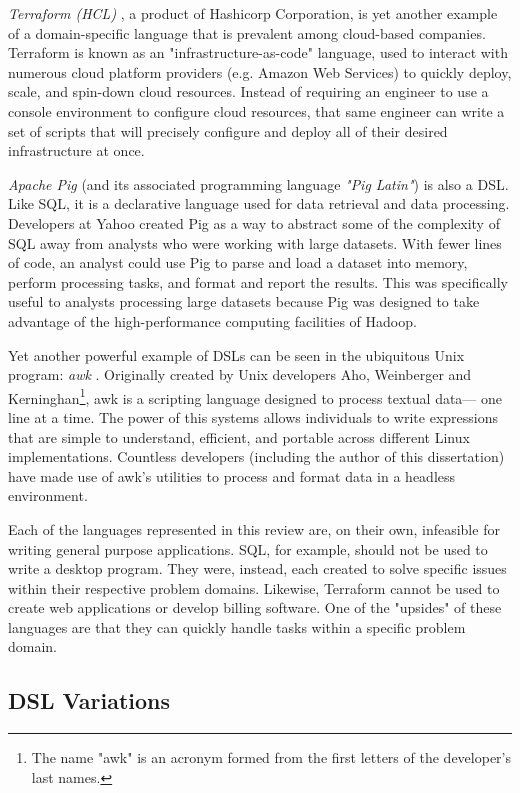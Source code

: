 \textit{Terraform (HCL)} \cite{dsl-terraform}, a product of Hashicorp Corporation, is yet another example of a domain-specific language that is prevalent among cloud-based companies. Terraform is known as an "infrastructure-as-code" language, used to interact with numerous cloud platform providers (e.g. Amazon Web Services) to quickly deploy, scale, and spin-down cloud resources. Instead of requiring an engineer to use a console environment to configure cloud resources, that same engineer can write a set of scripts that will precisely configure and deploy all of their desired infrastructure at once.

\textit{Apache Pig} \cite{dsl-pig-latin} (and its associated programming language \textit{"Pig Latin"}) is also a DSL. Like SQL, it is a declarative language used for data retrieval and data processing. Developers at Yahoo created Pig as a way to abstract some of the complexity of SQL away from analysts who were working with large datasets. With fewer lines of code, an analyst could use Pig to parse and load a dataset into memory, perform processing tasks, and format and report the results. This was specifically useful to analysts processing large datasets because Pig was designed to take advantage of the high-performance computing facilities of Hadoop.

Yet another powerful example of DSLs can be seen in the ubiquitous Unix program: \textit{awk} \cite{dsl-awk}. Originally created by Unix developers Aho, Weinberger and Kerninghan\footnote{The name "awk" is an acronym formed from the first letters of the developer's last names.}, awk is a scripting language designed to process textual data--- one line at a time. The power of this systems allows individuals to write expressions that are simple to understand, efficient, and portable across different Linux implementations. Countless developers (including the author of this dissertation) have made use of awk's utilities to process and format data in a headless environment.

Each of the languages represented in this review are, on their own, infeasible for writing general purpose applications. SQL, for example, should not be used to write a desktop program. They were, instead, each created to solve specific issues within their respective problem domains. Likewise, Terraform cannot be used to create web applications or develop billing software. One of the "upsides" of these languages are that they can quickly handle tasks within a specific problem domain.

\subsection{DSL Variations}

